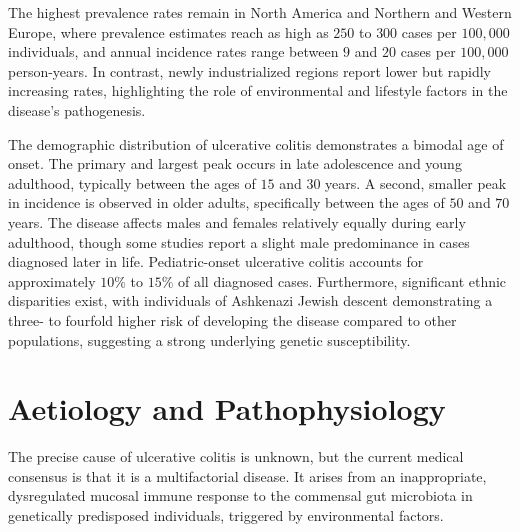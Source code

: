 The highest prevalence rates remain in North America and Northern and Western Europe, where prevalence estimates reach as high as $250$ to $300$ cases per $100{,}000$ individuals, and annual incidence rates range between $9$ and $20$ cases per $100{,}000$ person-years. In contrast, newly industrialized regions report lower but rapidly increasing rates, highlighting the role of environmental and lifestyle factors in the disease's pathogenesis.

The demographic distribution of ulcerative colitis demonstrates a bimodal age of onset. The primary and largest peak occurs in late adolescence and young adulthood, typically between the ages of $15$ and $30$ years. A second, smaller peak in incidence is observed in older adults, specifically between the ages of $50$ and $70$ years. The disease affects males and females relatively equally during early adulthood, though some studies report a slight male predominance in cases diagnosed later in life. Pediatric-onset ulcerative colitis accounts for approximately $10\%$ to $15\%$ of all diagnosed cases. Furthermore, significant ethnic disparities exist, with individuals of Ashkenazi Jewish descent demonstrating a three- to fourfold higher risk of developing the disease compared to other populations, suggesting a strong underlying genetic susceptibility.

\section*{Aetiology and Pathophysiology}
The precise cause of ulcerative colitis is unknown, but the current medical consensus is that it is a multifactorial disease. It arises from an inappropriate, dysregulated mucosal immune response to the commensal gut microbiota in genetically predisposed individuals, triggered by environmental factors.

